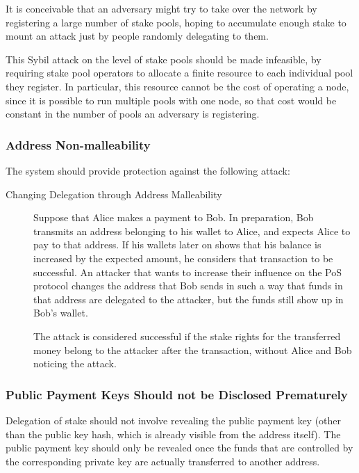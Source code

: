 \documentclass[11pt,a4paper,dvipsnames,twosided]{article}
\begin{document}
It is conceivable that an adversary might try to take over the
network by registering a large number of stake pools, hoping to
accumulate enough stake to mount an attack just by people randomly
delegating to them.

This Sybil attack on the level of stake pools should be made infeasible,
by requiring stake pool operators to allocate a finite resource to each
individual pool they register. In particular, this resource cannot be
the cost of operating a node, since it is possible to run multiple pools
with one node, so that cost would be constant in the number of pools an
adversary is registering.

\subsubsection{Address Non-malleability}
\label{address-nonmalleability}

The system should provide protection against the following attack:

\begin{description}
\item[Changing Delegation through Address Malleability]
Suppose that Alice makes a payment to Bob. In preparation, Bob transmits
an address belonging to his wallet to Alice, and expects Alice to pay to
that address. If his wallets later on shows that his balance is
increased by the expected amount, he considers that transaction to be
successful. An attacker that wants to increase their influence on the
PoS protocol changes the address that Bob sends in such a way that funds
in that address are delegated to the attacker, but the funds still show
up in Bob's wallet.

The attack is considered successful if the stake rights for the
transferred money belong to the attacker after the transaction, without
Alice and Bob noticing the attack.
\end{description}

\subsubsection{Public Payment Keys Should not be Disclosed Prematurely}
\label{public-spending-keys-should-not-be-disclosed-prematurely}

Delegation of stake should not involve revealing the public payment key (other
than the public key hash, which is already visible from the address itself). The
public payment key should only be revealed once the funds that are controlled
by the corresponding private key are actually transferred to another address.
\end{document}
